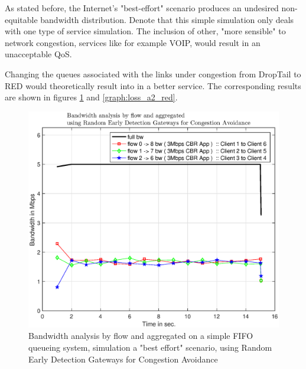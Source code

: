 \documentclass[conference,compsoc]{IEEEtran}
\begin{document}
     As stated before, the Internet's "best-effort" scenario produces an undesired non-equitable bandwidth distribution. Denote that this simple simulation only deals with one type of service simulation. The inclusion of other, "more sensible" to network congestion, services like for example VOIP, would result in an unacceptable QoS.\par
     Changing the queues associated with the links under congestion from DropTail to RED would theoretically result into in a better service. The corresponding results are shown in figures \ref{graph:bw_a2_red} and \ref{graph:loss_a2_red}.

     \begin{figure}[H]
     \centering
     \includegraphics[width=1\columnwidth]{EPS/A/bw_a2_red.eps}
     \caption{Bandwidth analysis by flow and aggregated on a simple FIFO queueing system, simulation a "best effort" scenario, using Random Early Detection Gateways for Congestion Avoidance}
     \label{graph:bw_a2_red}
     \end{figure}
\end{document}
